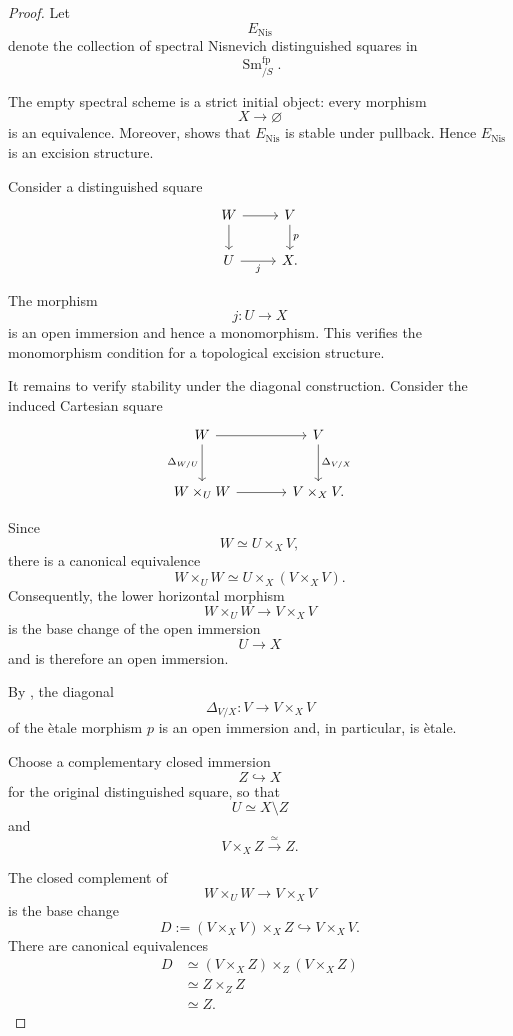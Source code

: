 \begin{proof}
Let
\[
    E_{\mathrm{Nis}}
\]
denote the collection of spectral Nisnevich distinguished squares in
\[
    \operatorname{Sm}^{\mathrm{fp}}_{/S}.
\]

The empty spectral scheme is a strict initial object: every morphism
\[
    X
    \longrightarrow
    \varnothing
\]
is an equivalence. Moreover,
shows that \(E_{\mathrm{Nis}}\) is stable under pullback. Hence
\(E_{\mathrm{Nis}}\) is an excision structure.

Consider a distinguished square
\[
\begin{tikzcd}
    W \arrow[r] \arrow[d]
    &
    V \arrow[d, "p"]
    \\
    U \arrow[r, "j"']
    &
    X.
\end{tikzcd}
\]

The morphism
\[
    j
    \colon
    U
    \longrightarrow
    X
\]
is an open immersion and hence a monomorphism. This verifies the
monomorphism condition for a topological excision structure.

It remains to verify stability under the diagonal construction. Consider
the induced Cartesian square
\[
\begin{tikzcd}[column sep=large, row sep=large]
    W
        \arrow[r]
        \arrow[d, "\Delta_{W/U}"']
    &
    V
        \arrow[d, "\Delta_{V/X}"]
    \\
    W\times_UW
        \arrow[r]
    &
    V\times_XV.
\end{tikzcd}
\]

Since
\[
    W
    \simeq
    U\times_XV,
\]
there is a canonical equivalence
\[
    W\times_UW
    \simeq
    U\times_X(V\times_XV).
\]
Consequently, the lower horizontal morphism
\[
    W\times_UW
    \longrightarrow
    V\times_XV
\]
is the base change of the open immersion
\[
    U
    \longrightarrow
    X
\]
and is therefore an open immersion.

By
,
the diagonal
\[
    \Delta_{V/X}
    \colon
    V
    \longrightarrow
    V\times_XV
\]
of the \`etale morphism \(p\) is an open immersion and, in particular,
is \`etale.

Choose a complementary closed immersion
\[
    Z
    \hookrightarrow
    X
\]
for the original distinguished square, so that
\[
    U
    \simeq
    X\setminus Z
\]
and
\[
    V\times_XZ
    \xrightarrow{\simeq}
    Z.
\]

The closed complement of
\[
    W\times_UW
    \longrightarrow
    V\times_XV
\]
is the base change
\[
    D
    :=
    (V\times_XV)\times_XZ
    \hookrightarrow
    V\times_XV.
\]
There are canonical equivalences
\[
\begin{aligned}
    D
    &\simeq
    (V\times_XZ)\times_Z(V\times_XZ)
    \\
    &\simeq
    Z\times_ZZ
    \\
    &\simeq
    Z.
\end{aligned}
\]


\end{proof}
